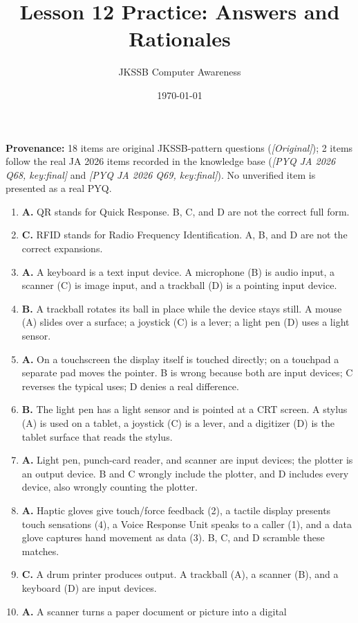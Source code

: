 \documentclass[11pt]{article}
\title{Lesson 12 Practice: Answers and Rationales}
\author{JKSSB Computer Awareness}
\date{\today}
\begin{document}
\maketitle
\noindent\textbf{Provenance:} 18 items are original JKSSB-pattern questions
(\textit{[Original]}); 2 items follow the real JA 2026 items recorded in the
knowledge base (\textit{[PYQ JA 2026 Q68, key:final]} and
\textit{[PYQ JA 2026 Q69, key:final]}). No unverified item is presented as a
real PYQ.
\begin{enumerate}[label=\textbf{Q\arabic*.}, leftmargin=*]
\item \textbf{A.} QR stands for Quick Response. B, C, and D are not the
  correct full form.
\item \textbf{C.} RFID stands for Radio Frequency Identification. A, B, and D
  are not the correct expansions.
\item \textbf{A.} A keyboard is a text input device. A microphone (B) is
  audio input, a scanner (C) is image input, and a trackball (D) is a
  pointing input device.
\item \textbf{B.} A trackball rotates its ball in place while the device
  stays still. A mouse (A) slides over a surface; a joystick (C) is a lever;
  a light pen (D) uses a light sensor.
\item \textbf{A.} On a touchscreen the display itself is touched directly;
  on a touchpad a separate pad moves the pointer. B is wrong because both are
  input devices; C reverses the typical uses; D denies a real difference.
\item \textbf{B.} The light pen has a light sensor and is pointed at a CRT
  screen. A stylus (A) is used on a tablet, a joystick (C) is a lever, and a
  digitizer (D) is the tablet surface that reads the stylus.
\item \textbf{A.} Light pen, punch-card reader, and scanner are input devices;
  the plotter is an output device. B and C wrongly include the plotter, and D
  includes every device, also wrongly counting the plotter.
\item \textbf{A.} Haptic gloves give touch/force feedback (2), a tactile
  display presents touch sensations (4), a Voice Response Unit speaks to a
  caller (1), and a data glove captures hand movement as data (3). B, C, and
  D scramble these matches.
\item \textbf{C.} A drum printer produces output. A trackball (A), a scanner
  (B), and a keyboard (D) are input devices.
\item \textbf{A.} A scanner turns a paper document or picture into a digital

\end{enumerate}
\end{document}
